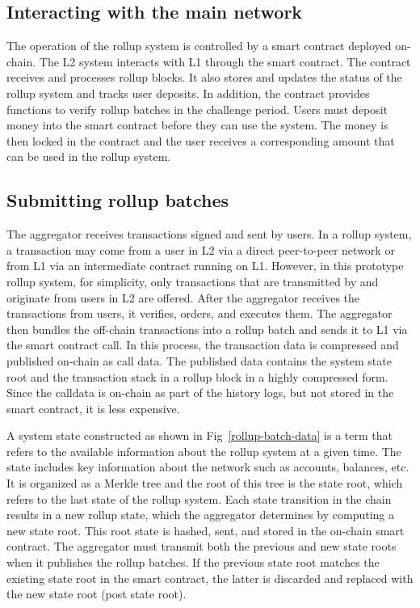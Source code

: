 \documentclass{article}
\begin{document}
\subsection{Interacting with the main network}
The operation of the rollup system is controlled by a smart contract deployed on-chain. The L2 system interacts with L1 through the smart contract. The contract receives and processes rollup blocks. It also stores and updates the status of the rollup system and tracks user deposits. In addition, the contract provides functions to verify rollup batches in the challenge period. Users must deposit money into the smart contract before they can use the system. The money is then locked in the contract and the user receives a corresponding amount that can be used in the rollup system.

\subsection{Submitting rollup batches}
The aggregator receives transactions signed and sent by users. In a rollup system, a transaction may come from a user in L2 via a direct peer-to-peer network or from L1 via an intermediate contract running on L1. However, in this prototype rollup system, for simplicity, only transactions that are transmitted by and originate from users in L2 are offered. After the aggregator receives the transactions from users, it verifies, orders, and executes them. The aggregator then bundles the off-chain transactions into a rollup batch and sends it to L1 via the smart contract call. In this process, the transaction data is compressed and published on-chain as call data. The published data contains the system state root and the transaction stack in a rollup block in a highly compressed form. Since the calldata is on-chain as part of the history logs, but not stored in the smart contract, it is less expensive.

A system state constructed as shown in  Fig~\ref{rollup-batch-data} is a term that refers to the available information about the rollup system at a given time. The state includes key information about the network such as accounts, balances, etc. It is organized as a Merkle tree and the root of this tree is the state root, which refers to the last state of the rollup system. Each state transition in the chain results in a new rollup state, which the aggregator determines by computing a new state root. This root state is hashed, sent, and stored in the on-chain smart contract. The aggregator must transmit both the previous and new state roots when it publishes the rollup batches. If the previous state root matches the existing state root in the smart contract, the latter is discarded and replaced with the new state root (post state root).
\end{document}
